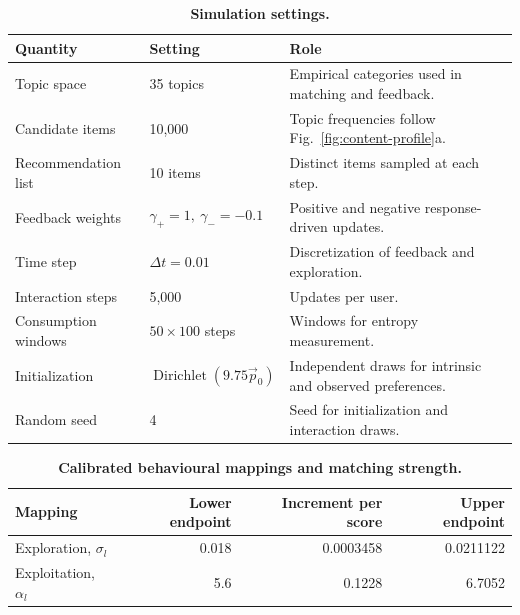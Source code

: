 \begin{table}[!htbp]\centering
\caption{\textbf{Simulation settings.}}\label{tab:parameters}
\begin{tabularx}{\linewidth}{@{}l l >{\raggedright\arraybackslash}X@{}}\toprule
Quantity & Setting & Role \\ \midrule
Topic space & 35 topics & Empirical categories used in matching and feedback. \\
Candidate items & 10,000 & Topic frequencies follow Fig.~\ref{fig:content-profile}a. \\
Recommendation list & 10 items & Distinct items sampled at each step. \\
Feedback weights & $\gamma_+=1,\ \gamma_-=-0.1$ & Positive and negative response-driven updates. \\
Time step & $\Delta t=0.01$ & Discretization of feedback and exploration. \\
Interaction steps & 5,000 & Updates per user. \\
Consumption windows & $50\times100$ steps & Windows for entropy measurement. \\
Initialization & $\operatorname{Dirichlet}(9.75\vec{p}_0)$ & Independent draws for intrinsic and observed preferences. \\
Random seed & 4 & Seed for initialization and interaction draws. \\
\bottomrule\end{tabularx}
\end{table}

\begin{table}[!htbp]\centering
\caption{\textbf{Calibrated behavioural mappings and matching strength.}}\label{tab:calibration-parameters}
\begin{tabular*}{\linewidth}{@{\extracolsep{\fill}}lrrr@{}}\toprule
Mapping & Lower endpoint & Increment per score & Upper endpoint \\ \midrule
Exploration, $\sigma_l$ & 0.018 & 0.0003458 & 0.0211122 \\
Exploitation, $\alpha_l$ & 5.6 & 0.1228 & 6.7052 \\
\bottomrule\end{tabular*}
\end{table}
